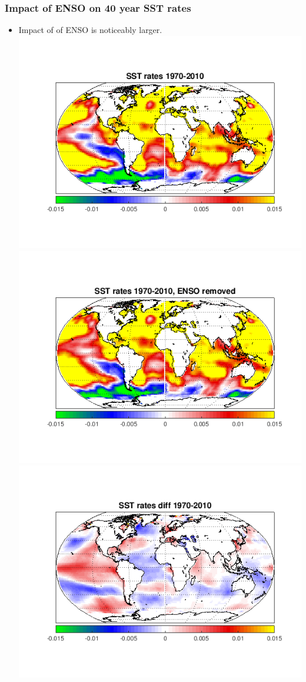 \documentclass[10pt,t]{beamer}
\begin{document}
 \begin{frame}
  \frametitle{Impact of ENSO on 40 year SST rates}
 \begin{itemize}
    \item Impact of of ENSO is noticeably larger.   
     \centering
    \includegraphics[width=0.4\linewidth]{./figures/sst_rates_1970_2010.png}
    \includegraphics[width=0.4\linewidth]{./figures/sst_rates_1970_2010_enso_removed} \\
    \includegraphics[width=0.4\linewidth]{./figures/sst_rates_diff_1970_2010} 
 \end{itemize}
 \end{frame}
\end{document}

